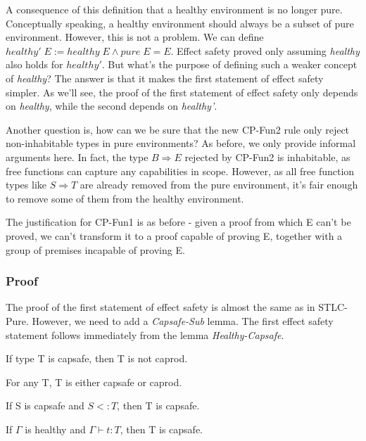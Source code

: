 A consequence of this definition that a healthy environment is no
longer pure. Conceptually speaking, a healthy environment should
always be a subset of pure environment. However, this is not a
problem. We can define
$healthy' \; E := healthy \; E \wedge pure \; E = E$. Effect safety
proved only assuming \emph{healthy} also holds for $healthy'$. But
what's the purpose of defining such a weaker concept of
\emph{healthy}? The answer is that it makes the first statement of
effect safety simpler. As we'll see, the proof of the first statement
of effect safety only depends on \emph{healthy}, while the second
depends on \emph{healthy'}.

Another question is, how can we be sure that the new CP-Fun2 rule only
reject non-inhabitable types in pure environments? As before, we only
provide informal arguments here. In fact, the type $B \Rightarrow E$
rejected by CP-Fun2 is inhabitable, as free functions can capture
any capabilities in scope. However, as all free function types
like $S \Rightarrow T$ are already removed from the pure environment,
it's fair enough to remove some of them from the healthy environment.

The justification for CP-Fun1 is as before - given a proof from which
E can't be proved, we can't transform it to a proof capable of proving
E, together with a group of premises incapable of proving E.

\subsubsection{Proof}

The proof of the first statement of effect safety is almost the same
as in STLC-Pure. However, we need to add a \emph{Capsafe-Sub} lemma.
The first effect safety statement follows immediately from the lemma
\emph{Healthy-Capsafe}.

\begin{lemma}
 If type T is capsafe, then T is not caprod.
\end{lemma}

\begin{lemma}
 For any T, T is either capsafe or caprod.
\end{lemma}

\begin{lemma}
 If S is capsafe and $S <: T$, then T is capsafe.
\end{lemma}

\begin{lemma}
  If $\Gamma$ is healthy and $\Gamma \vdash t : T$, then T is capsafe.
\end{lemma}

